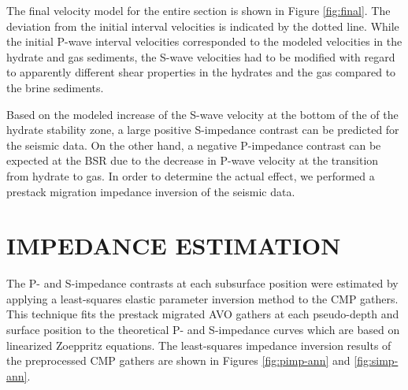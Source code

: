 

The final velocity model for the entire section is shown in Figure
\ref{fig:final}. The deviation from the initial interval velocities is indicated
by the dotted line. While the initial P-wave interval velocities corresponded
to the modeled velocities in the hydrate and gas sediments,
the S-wave velocities
had to be modified with regard to apparently different shear properties in the
hydrates and the gas compared to the brine sediments.
\par
Based on the modeled increase of the S-wave velocity at the bottom of the
of the hydrate stability zone, a large positive S-impedance contrast can be
predicted for the seismic data. On the other hand, a negative P-impedance
contrast can be expected at the BSR due to the decrease in P-wave velocity
at the transition from hydrate to gas. In order to determine the actual effect,
we performed a prestack migration impedance inversion of the seismic data.





\section{IMPEDANCE ESTIMATION}

The P- and S-impedance contrasts at each subsurface position were estimated 
by applying a least-squares elastic parameter inversion method 
\cite[]{lumley.sep.70.165,lumley.sep.77.211} to the CMP gathers. This technique
fits the prestack migrated AVO gathers at each pseudo-depth and surface 
position to the theoretical P- and S-impedance curves which are based on
linearized Zoeppritz equations. The least-squares impedance inversion results
of the preprocessed CMP gathers are shown in Figures \ref{fig:pimp-ann} and 
\ref{fig:simp-ann}.




